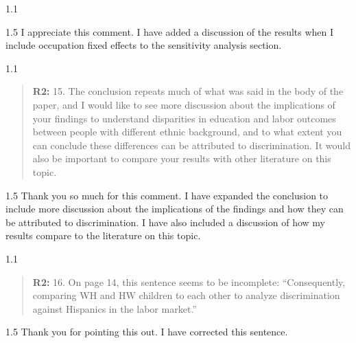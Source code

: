 \documentclass[12pt,english]{article}
\newcommand{\rrquote}{1.1}
\newcommand{\rrxspc}{1.5}
\begin{document}
\begin{refsection}
\begin{spacing}{\rrquote}
\begin{quotation}
        \end{quotation}
        \end{spacing}
            
        \begin{spacing}{\rrxspc}
            I appreciate this comment. I have added a discussion of the results when I include occupation fixed effects to the sensitivity analysis section.
    \end{spacing}

    \begin{spacing}{\rrquote}
        \begin{quotation}
        \textbf{R2: } 15. The conclusion repeats much of what was said in the body of the paper, and I would like to see more discussion about the implications of your findings to understand disparities in education and labor outcomes between people with different ethnic background, and to what extent you can conclude these differences can be attributed to discrimination. It would also be important to compare your results with other literature on this topic.
              
        \end{quotation}
        \end{spacing}
        
        \begin{spacing}{\rrxspc}
            Thank you so much for this comment. I have expanded the conclusion to include more discussion about the implications of the findings and how they can be attributed to discrimination. I have also included a discussion of how my results compare to the literature on this topic.
    \end{spacing}

    \begin{spacing}{\rrquote}
        \begin{quotation}
        \textbf{R2: } 16. On page 14, this sentence seems to be incomplete: “Consequently, comparing WH and HW children to each other to analyze discrimination against Hispanics in the labor market.”

              
        \end{quotation}
        \end{spacing}
        
        \begin{spacing}{\rrxspc}
            Thank you for pointing this out. I have corrected this sentence.
    \end{spacing}


\end{refsection}
\end{document}
